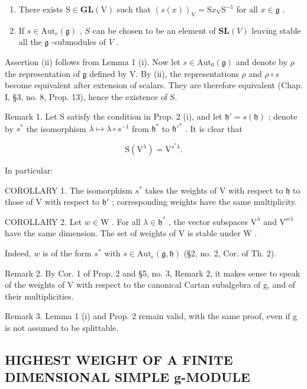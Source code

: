 \begin{enumerate}
\def\labelenumi{(\roman{enumi})}
\item
  There exists \(\mathrm{S} \in \mathbf{GL}(\mathrm{V})\) such that \((s(x))_{\mathrm{V}} = \mathrm{S}x_{\mathrm{V}}\mathrm{S}^{-1}\) for all \(x \in \mathfrak{g}\) .
\item
  If \(s \in \mathrm{Aut}_e(\mathfrak{g})\) , \(S\) can be chosen to be an element of \(\mathbf{SL}(V)\) leaving stable all the \(\mathfrak{g}\) -submodules of \(V\) .
\end{enumerate}

Assertion (ii) follows from Lemma 1 (i). Now let \(s \in \mathrm{Aut}_0(\mathfrak{g})\) and denote by \(\rho\) the representation of \(\mathfrak{g}\) defined by V. By (ii), the representations \(\rho\) and \(\rho \circ s\) become equivalent after extension of scalars. They are therefore equivalent (Chap. I, §3, no. 8, Prop. 13), hence the existence of S.

Remark 1. Let S satisfy the condition in Prop. 2 (i), and let \(\mathfrak{h}' = s(\mathfrak{h})\) ; denote by \(s^*\) the isomorphism \(\lambda \mapsto \lambda \circ s^{-1}\) from \(\mathfrak{h}^*\) to \(\mathfrak{h}'^*\) . It is clear that

\[
\mathrm{S} (\mathrm{V} ^ {\lambda}) = \mathrm{V} ^ {s ^ {*} \lambda}.
\]

In particular:

COROLLARY 1. The isomorphism \(s^*\) takes the weights of V with respect to \(\mathfrak{h}\) to those of V with respect to \(\mathfrak{h}'\) ; corresponding weights have the same multiplicity.

COROLLARY 2. Let \(w \in \mathrm{W}\) . For all \(\lambda \in \mathfrak{h}^*\) , the vector subspaces \(\mathrm{V}^{\lambda}\) and \(\mathrm{V}^{w\lambda}\) have the same dimension. The set of weights of \(\mathrm{V}\) is stable under \(\mathrm{W}\) .

Indeed, \(w\) is of the form \(s^*\) with \(s \in \mathrm{Aut}_e(\mathfrak{g}, \mathfrak{h})\) (§2, no. 2, Cor. of Th. 2).

Remark 2. By Cor. 1 of Prop. 2 and §5, no. 3, Remark 2, it makes sense to speak of the weights of V with respect to the canonical Cartan subalgebra of g, and of their multiplicities.

Remark 3. Lemma 1 (i) and Prop. 2 remain valid, with the same proof, even if g is not assumed to be splittable.

\subsection{HIGHEST WEIGHT OF A FINITE DIMENSIONAL SIMPLE g-MODULE}


